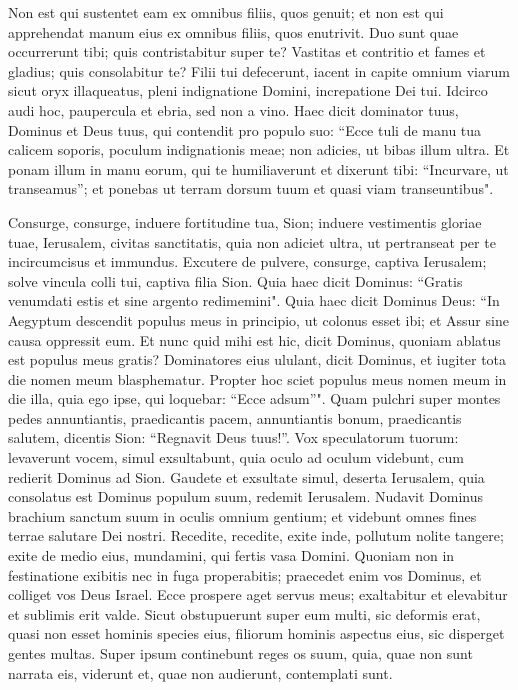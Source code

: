 \begin{biblechapter}
\verse Non est qui sustentet eam ex omnibus filiis, quos genuit; et non est qui apprehendat manum eius ex omnibus filiis, quos enutrivit. 
\verse Duo sunt quae occurrerunt tibi; quis contristabitur super te? Vastitas et contritio et fames et gladius; quis consolabitur te? 
\verse Filii tui defecerunt, iacent in capite omnium viarum sicut oryx illaqueatus, pleni indignatione Domini, increpatione Dei tui. 
\verse Idcirco audi hoc, paupercula et ebria, sed non a vino. 
\verse Haec dicit dominator tuus, Dominus et Deus tuus, qui contendit pro populo suo: “Ecce tuli de manu tua calicem soporis, poculum indignationis meae; non adicies, ut bibas illum ultra. 
\verse Et ponam illum in manu eorum, qui te humiliaverunt et dixerunt tibi: “Incurvare, ut transeamus”; et ponebas ut terram dorsum tuum et quasi viam transeuntibus". 
\end{biblechapter}

\begin{biblechapter}  
\verse Consurge, consurge, induere fortitudine tua, Sion; induere vestimentis gloriae tuae, Ierusalem, civitas sanctitatis, quia non adiciet ultra, ut pertranseat per te incircumcisus et immundus. 
\verse Excutere de pulvere, consurge, captiva Ierusalem; solve vincula colli tui, captiva filia Sion. 
\verse Quia haec dicit Dominus: “Gratis venumdati estis et sine argento redimemini". 
\verse Quia haec dicit Dominus Deus: “In Aegyptum descendit populus meus in principio, ut colonus esset ibi; et Assur sine causa oppressit eum. 
\verse Et nunc quid mihi est hic, dicit Dominus, quoniam ablatus est populus meus gratis? Dominatores eius ululant, dicit Dominus, et iugiter tota die nomen meum blasphematur. 
\verse Propter hoc sciet populus meus nomen meum in die illa, quia ego ipse, qui loquebar: “Ecce adsum”". 
\verse Quam pulchri super montes pedes annuntiantis, praedicantis pacem, annuntiantis bonum, praedicantis salutem, dicentis Sion: “Regnavit Deus tuus!”. 
\verse Vox speculatorum tuorum: levaverunt vocem, simul exsultabunt, quia oculo ad oculum videbunt, cum redierit Dominus ad Sion. 
\verse Gaudete et exsultate simul, deserta Ierusalem, quia consolatus est Dominus populum suum, redemit Ierusalem. 
\verse Nudavit Dominus brachium sanctum suum in oculis omnium gentium; et videbunt omnes fines terrae salutare Dei nostri. 
\verse Recedite, recedite, exite inde, pollutum nolite tangere; exite de medio eius, mundamini, qui fertis vasa Domini. 
\verse Quoniam non in festinatione exibitis nec in fuga properabitis; praecedet enim vos Dominus, et colliget vos Deus Israel. 
\verse Ecce prospere aget servus meus; exaltabitur et elevabitur et sublimis erit valde. 
\verse Sicut obstupuerunt super eum multi, sic deformis erat, quasi non esset hominis species eius, filiorum hominis aspectus eius, 
\verse sic disperget gentes multas. Super ipsum continebunt reges os suum, quia, quae non sunt narrata eis, viderunt et, quae non audierunt, contemplati sunt. 
\end{biblechapter}

